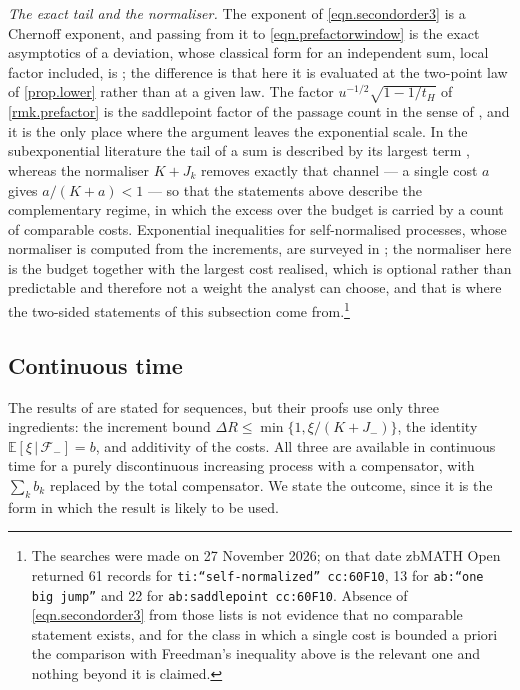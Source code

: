 \documentclass[12pt,oneside,reqno,fleqn]{amsart}
\numberwithin{equation}{section}
\theoremstyle{remark}
\newcommand\cff{{\mathcal F}}
\newcommand\mE{{\mathbb E}}
\newcommand\E{\mE}
\newcommand{\1}{{\mathbf 1}}
\renewcommand{\le}{\leq}
\begin{document}
	\medskip
	\noindent\textit{The exact tail and the normaliser.} The exponent of \eqref{eqn.secondorder3} is a Chernoff exponent, and passing from it to \eqref{eqn.prefactorwindow} is the exact asymptotics of a deviation, whose classical form for an independent sum, local factor included, is \cite{BR60}; the difference is that here it is evaluated at the two-point law of \cref{prop.lower} rather than at a given law. The factor $u^{-1/2}\sqrt{1-1/t_H}$ of \cref{rmk.prefactor} is the saddlepoint factor of the passage count in the sense of \cite{Jen95}, and it is the only place where the argument leaves the exponential scale. In the subexponential literature the tail of a sum is described by its largest term \cite{AK96}, whereas the normaliser $K+J_k$ removes exactly that channel --- a single cost $a$ gives $a/(K+a)<1$ --- so that the statements above describe the complementary regime, in which the excess over the budget is carried by a count of comparable costs. Exponential inequalities for self-normalised processes, whose normaliser is computed from the increments, are surveyed in \cite{dlPnKL07}; the normaliser here is the budget together with the largest cost realised, which is optional rather than predictable and therefore not a weight the analyst can choose, and that is where the two-sided statements of this subsection come from.\footnote{The searches were made on 27 November 2026; on that date zbMATH Open returned 61 records for \texttt{ti:``self-normalized'' cc:60F10}, 13 for \texttt{ab:``one big jump''} and 22 for \texttt{ab:saddlepoint cc:60F10}. Absence of \eqref{eqn.secondorder3} from those lists is not evidence that no comparable statement exists, and for the class in which a single cost is bounded a priori the comparison with Freedman's inequality above is the relevant one and nothing beyond it is claimed.}

\subsection{Continuous time} %
\label{sec:continuous}

	The results of  are stated for sequences, but their proofs use only three ingredients: the increment bound $\Delta R\le\min\{1,\xi/(K+J_{-})\}$, the identity $\E[\xi\,|\,\cff_{-}]=b$, and additivity of the costs. All three are available in continuous time for a purely discontinuous increasing process with a compensator, with $\sum_kb_k$ replaced by the total compensator. We state the outcome, since it is the form in which the result is likely to be used.
\end{document}
